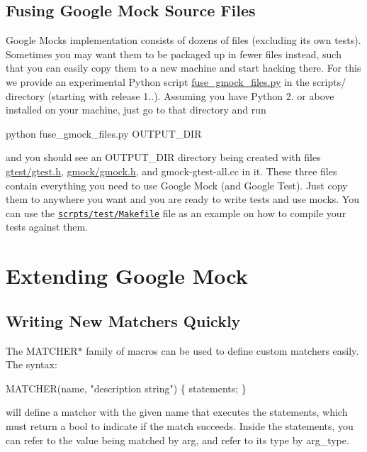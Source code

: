 \subsection*{Fusing Google Mock Source Files}

Google Mock\textquotesingle{}s implementation consists of dozens of files (excluding its own tests). Sometimes you may want them to be packaged up in fewer files instead, such that you can easily copy them to a new machine and start hacking there. For this we provide an experimental Python script {\ttfamily \hyperlink{fuse__gmock__files_8py}{fuse\+\_\+gmock\+\_\+files.\+py}} in the {\ttfamily scripts/} directory (starting with release 1..). Assuming you have Python 2. or above installed on your machine, just go to that directory and run 
\begin{DoxyCode}
python fuse\_gmock\_files.py OUTPUT\_DIR
\end{DoxyCode}


and you should see an {\ttfamily O\+U\+T\+P\+U\+T\+\_\+\+D\+IR} directory being created with files {\ttfamily \hyperlink{gtest_8h}{gtest/gtest.\+h}}, {\ttfamily \hyperlink{gmock_8h}{gmock/gmock.\+h}}, and {\ttfamily gmock-\/gtest-\/all.\+cc} in it. These three files contain everything you need to use Google Mock (and Google Test). Just copy them to anywhere you want and you are ready to write tests and use mocks. You can use the \href{http://code.google.com/p/googlemock/source/browse/trunk/scripts/test/Makefile}{\tt scrpts/test/\+Makefile} file as an example on how to compile your tests against them.

\section*{Extending Google Mock}

\subsection*{Writing New Matchers Quickly}

The {\ttfamily M\+A\+T\+C\+H\+E\+R$\ast$} family of macros can be used to define custom matchers easily. The syntax\+:


\begin{DoxyCode}
MATCHER(name, "description string") \{ statements; \}
\end{DoxyCode}


will define a matcher with the given name that executes the statements, which must return a {\ttfamily bool} to indicate if the match succeeds. Inside the statements, you can refer to the value being matched by {\ttfamily arg}, and refer to its type by {\ttfamily arg\+\_\+type}.

